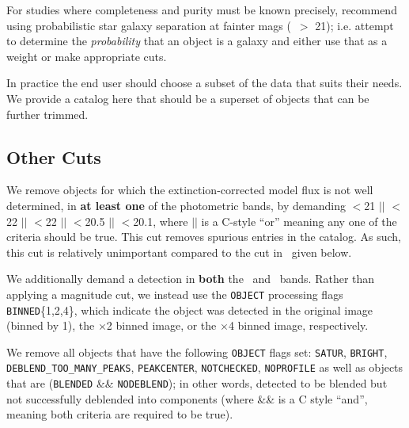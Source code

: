 \documentclass[12pt,preprint]{aastex}
\begin{document}
For studies where completeness and purity must be known precisely,
\citet{ScrantonMag05} recommend using probabilistic star galaxy separation at
fainter mags (\rmag\ $ > $ 21); i.e.  attempt to determine the {\it
probability} that an object is a galaxy and either use that as a weight or make
appropriate cuts. 


In practice the end user should choose a subset of the data that suits their
needs.  We provide a catalog here that should be a superset of objects that can
be further trimmed.

\subsection{Other Cuts}

We remove objects for which the extinction-corrected \citep{Schlegel98} model
flux is not well determined, in {\bf at least one} of the photometric bands, by
demanding \umag$ < $21 $||$ \gmag$ < $22 $||$ \rmag$ < $22 $||$ \imag$ < $20.5
$||$ \zmag$ < $20.1, where $||$ is a C-style ``or'' meaning any one of the
criteria should be true. This cut removes spurious entries in the catalog.  As
such, this cut is relatively unimportant compared to the cut in \rmag\ given
below.

We additionally demand a detection in {\bf both} the \rmag\ and \imag\ bands.
Rather than applying a magnitude cut, we instead use the \texttt{OBJECT}
processing flags \texttt{BINNED}\{1,2,4\}, which indicate the object was
detected in the original image (binned by 1), the $\times$2 binned image, or
the $\times$4 binned image, respectively\citep{Stough02}.

\begin{sloppypar}
We remove all objects that have the following \texttt{OBJECT} flags set:
\texttt{SATUR}, \texttt{BRIGHT}, \texttt{DEBLEND\_TOO\_MANY\_PEAKS},
\texttt{PEAKCENTER}, \texttt{NOTCHECKED}, \texttt{NOPROFILE} as well as objects
that are (\texttt{BLENDED} \&\& \texttt{NODEBLEND}); in other words, detected
to be blended but not successfully deblended into components (where \&\& is
a C style ``and'', meaning both criteria are required to be true). 
\end{sloppypar}

\end{document}
